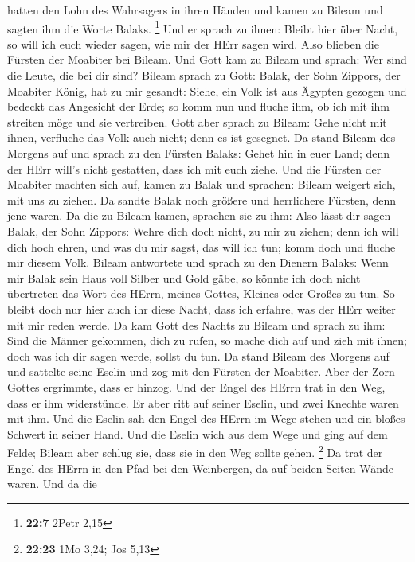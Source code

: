 hatten den Lohn des Wahrsagers in ihren Händen und kamen zu Bileam und
sagten ihm die Worte Balaks. \footnote{\textbf{22:7} 2Petr 2,15}
 Und er sprach zu ihnen: Bleibt hier über Nacht, so will ich
euch wieder sagen, wie mir der HErr sagen wird. Also blieben die Fürsten
der Moabiter bei Bileam.  Und Gott kam zu Bileam und sprach:
Wer sind die Leute, die bei dir sind?  Bileam sprach zu
Gott: Balak, der Sohn Zippors, der Moabiter König, hat zu mir gesandt:
 Siehe, ein Volk ist aus Ägypten gezogen und bedeckt das
Angesicht der Erde; so komm nun und fluche ihm, ob ich mit ihm streiten
möge und sie vertreiben.  Gott aber sprach zu Bileam: Gehe
nicht mit ihnen, verfluche das Volk auch nicht; denn es ist gesegnet.
 Da stand Bileam des Morgens auf und sprach zu den Fürsten
Balaks: Gehet hin in euer Land; denn der HErr will's nicht gestatten,
dass ich mit euch ziehe.  Und die Fürsten der Moabiter
machten sich auf, kamen zu Balak und sprachen: Bileam weigert sich, mit
uns zu ziehen.  Da sandte Balak noch größere und
herrlichere Fürsten, denn jene waren.  Da die zu Bileam
kamen, sprachen sie zu ihm: Also lässt dir sagen Balak, der Sohn
Zippors: Wehre dich doch nicht, zu mir zu ziehen;  denn ich
will dich hoch ehren, und was du mir sagst, das will ich tun; komm doch
und fluche mir diesem Volk.  Bileam antwortete und sprach
zu den Dienern Balaks: Wenn mir Balak sein Haus voll Silber und Gold
gäbe, so könnte ich doch nicht übertreten das Wort des HErrn, meines
Gottes, Kleines oder Großes zu tun.  So bleibt doch nur
hier auch ihr diese Nacht, dass ich erfahre, was der HErr weiter mit mir
reden werde.  Da kam Gott des Nachts zu Bileam und sprach
zu ihm: Sind die Männer gekommen, dich zu rufen, so mache dich auf und
zieh mit ihnen; doch was ich dir sagen werde, sollst du tun.
 Da stand Bileam des Morgens auf und sattelte seine Eselin
und zog mit den Fürsten der Moabiter.  Aber der Zorn Gottes
ergrimmte, dass er hinzog. Und der Engel des HErrn trat in den Weg, dass
er ihm widerstünde. Er aber ritt auf seiner Eselin, und zwei Knechte
waren mit ihm.  Und die Eselin sah den Engel des HErrn im
Wege stehen und ein bloßes Schwert in seiner Hand. Und die Eselin wich
aus dem Wege und ging auf dem Felde; Bileam aber schlug sie, dass sie in
den Weg sollte gehen. \footnote{\textbf{22:23} 1Mo 3,24; Jos 5,13}
 Da trat der Engel des HErrn in den Pfad bei den
Weinbergen, da auf beiden Seiten Wände waren.  Und da die
